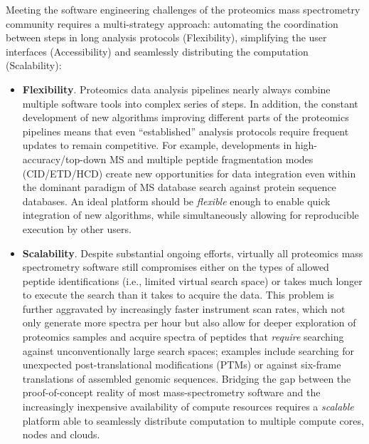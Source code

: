 \documentclass[arial,11pt]{article}
\begin{document}
Meeting the software engineering challenges of the proteomics mass spectrometry community requires a multi-strategy approach: automating the coordination between steps in long analysis protocols (Flexibility), simplifying the user interfaces (Accessibility) and seamlessly distributing the computation (Scalability):
%
\begin{itemize}
  \item {\bf Flexibility}. Proteomics data analysis pipelines nearly always combine multiple software tools into complex series of steps. In addition, the constant development of new algorithms improving different parts of the proteomics pipelines means that even ``established'' analysis protocols require frequent updates to remain competitive. For example, developments in high-accuracy/top-down MS and multiple peptide fragmentation modes (CID/ETD/HCD) create new opportunities for data integration even within the dominant paradigm of MS database search against protein sequence databases. An ideal platform should be {\em flexible} enough to enable quick integration of new algorithms, while simultaneously allowing for reproducible execution by other users.

  \item {\bf Scalability}. Despite substantial ongoing efforts, virtually all proteomics mass spectrometry software still compromises either on the types of allowed peptide identifications (i.e., limited virtual search space) or takes much longer to execute the search than it takes to acquire the data. This problem is further aggravated by increasingly faster instrument scan rates, which not only generate more spectra per hour but also allow for deeper exploration of proteomics samples and acquire spectra of peptides that {\em require} searching against unconventionally large search spaces; examples include searching for unexpected post-translational modifications (PTMs) or against six-frame translations of assembled genomic sequences. Bridging the gap between the proof-of-concept reality of most mass-spectrometry software and the increasingly inexpensive availability of compute resources requires a {\em scalable} platform able to seamlessly distribute computation to multiple compute cores, nodes and clouds.


\end{itemize}
\end{document}
